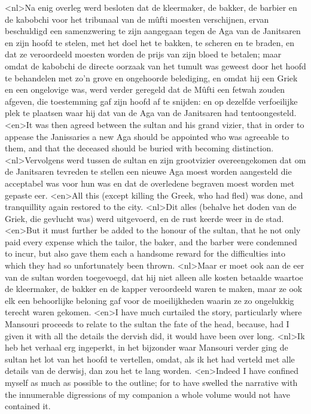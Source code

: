 <nl>Na enig overleg werd besloten dat de kleermaker, de bakker, de barbier en de kabobchi voor het tribunaal van de mûfti moesten verschijnen, ervan beschuldigd een samenzwering te zijn aangegaan tegen de Aga van de Janitsaren en zijn hoofd te stelen, met het doel het te bakken, te scheren en te braden, en dat ze veroordeeld moesten worden de prijs van zijn bloed te betalen; maar omdat de kabobchi de directe oorzaak van het tumult was geweest door het hoofd te behandelen met zo'n grove en ongehoorde belediging, en omdat hij een Griek en een ongelovige was, werd verder geregeld dat de Mûfti een fetwah zouden afgeven, die toestemming gaf zijn hoofd af te snijden: en  op dezelfde verfoeilijke  plek te plaatsen waar hij dat van de Aga van de Janitsaren had tentoongesteld.
<en>It was then agreed between the sultan and his grand vizier, that in order to appease the Janissaries a new Aga should be appointed who was agreeable to them, and that the deceased should be buried with becoming distinction.
<nl>Vervolgens werd tussen de sultan en zijn grootvizier overeengekomen dat om de Janitsaren tevreden te stellen een nieuwe Aga moest worden aangesteld die  acceptabel was voor hun  was en dat de overledene begraven moest worden met gepaste eer.
<en>All this (except killing the Greek, who had fled) was done, and tranquillity again restored to the city.
<nl>Dit alles (behalve het doden van de Griek, die gevlucht was) werd uitgevoerd, en de rust keerde weer  in de stad.
<en>But it must further be added to the honour of the sultan, that he not only paid every expense which the tailor, the baker, and the barber were condemned to incur, but also gave them each a handsome reward for the difficulties into which they had so unfortunately been thrown.
<nl>Maar er moet ook aan de eer van de sultan worden toegevoegd, dat hij niet alleen alle kosten betaalde waartoe de kleermaker, de bakker en de kapper veroordeeld waren te maken, maar ze ook elk een behoorlijke beloning gaf voor de moeilijkheden waarin ze zo ongelukkig terecht waren gekomen.
<en>I have much curtailed the story, particularly where Mansouri proceeds to relate to the sultan the fate of the head, because, had I given it with all the details the dervish did, it would have been over long.
<nl>Ik heb het verhaal erg ingeperkt, in het bijzonder waar Mansouri verder ging de sultan het lot van het hoofd te vertellen, omdat, als ik het had verteld met alle details van de derwisj, dan zou het te lang worden.
<en>Indeed I have confined myself as much as possible to the outline; for to have swelled the narrative with the innumerable digressions of my companion a whole volume would not have contained it.
